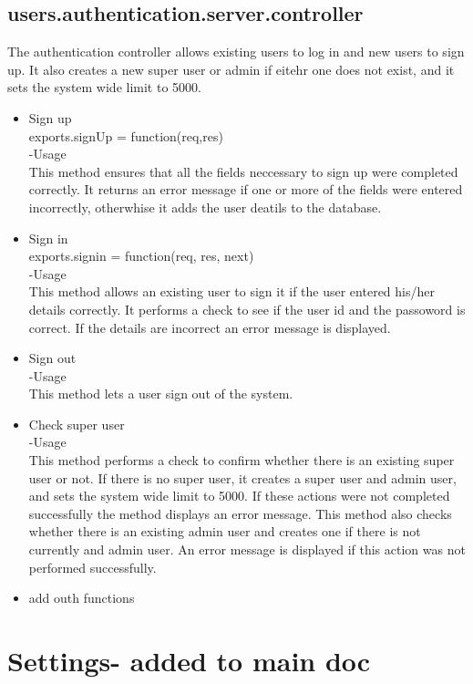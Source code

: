\documentclass[a4paper,12pt]{article}
\begin{document}
 \subsection{users.authentication.server.controller}
 The authentication controller allows existing users to log in and new users to sign up. It also creates a new super user or admin if eitehr one does not exist, and it sets the system wide limit to 5000.
 \begin{itemize}
 \item Sign up\\
  exports.signUp = function(req,res)\\
  -Usage\\
  This method ensures that all the fields neccessary to sign up were completed correctly. It returns an error message if one or more of the fields were entered incorrectly, otherwhise it adds the user deatils to the database.
  \item Sign in\\
exports.signin = function(req, res, next) \\
-Usage\\
This method allows an existing user to sign it if the user entered his/her details correctly. It performs a check to see if the user id and the passoword is correct. If the details are incorrect an error message is displayed.
\item Sign out\\
-Usage\\
This method lets a user sign out of the system.
  \item Check super user\\
  -Usage\\
  This method performs a check to confirm whether there is an existing super user or not. If there is no super user, it creates a super user and admin user, and sets the system wide limit to 5000. If these actions were not completed successfully the method displays an error message. This method also checks whether there is an existing admin user and creates one if there is not currently and admin user. An error message is displayed if this action was not performed successfully.
  
  \item add outh functions
 \end{itemize}
 
 \section{Settings- added to main doc}
\end{document}
